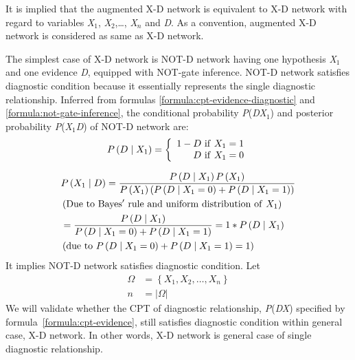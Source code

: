\documentclass{article}
\numberwithin{equation}{section}
\numberwithin{figure}{section}
\numberwithin{table}{section}
\begin{document}
It is implied that the augmented X-D network is equivalent to X-D network with regard to variables \textit{X}${}_{1}$, \textit{X}${}_{2}$,{\dots}, \textit{X${}_{n}$} and \textit{D}. As a convention, augmented X-D network is considered as same as X-D network.

The simplest case of X-D network is NOT-D network having one hypothesis \textit{X}${}_{1}$ and one evidence \textit{D}, equipped with NOT-gate inference. NOT-D network satisfies diagnostic condition because it essentially represents the single diagnostic relationship. Inferred from formulas \ref{formula:cpt-evidence-diagnostic} and \ref{formula:not-gate-inference}, the conditional probability \textit{P}(\textit{D{\textbar}X}${}_{1}$) and posterior probability \textit{P}(\textit{X}${}_{1}$\textit{{\textbar}D}) of NOT-D network are:
\[P\left(D\mathrel{\left|\vphantom{D X_1}\right.\kern-\nulldelimiterspace}X_1\right)=\left\{ \begin{array}{r}
1-D\ \mathrm{if}\ X_1=1 \\ 
D\ \mathrm{if}\ X_1=0 \end{array}
\right.\] 

\begin{align*}
&P\left(X_1\mathrel{\left|\vphantom{X_1 D}\right.\kern-\nulldelimiterspace}D\right)=\frac{P\left(D\mathrel{\left|\vphantom{D X_1}\right.\kern-\nulldelimiterspace}X_1\right)P\left(X_1\right)}{P\left(X_1\right)\left(P\left(D\mathrel{\left|\vphantom{D X_1=0}\right.\kern-\nulldelimiterspace}X_1=0\right)+P\left(D\mathrel{\left|\vphantom{D X_1=1}\right.\kern-\nulldelimiterspace}X_1=1\right)\right)}\\
&\left(\mathrm{Due}\ \mathrm{to}\ \mathrm{Bayes'}\ \mathrm{rule}\ \mathrm{and}\ \mathrm{uniform}\ \mathrm{distribution}\ \mathrm{of}\ X_1\right)\\
&=\frac{P\left(D\mathrel{\left|\vphantom{D X_1}\right.\kern-\nulldelimiterspace}X_1\right)}{P\left(D\mathrel{\left|\vphantom{D X_1=0}\right.\kern-\nulldelimiterspace}X_1=0\right)+P\left(D\mathrel{\left|\vphantom{D X_1=1}\right.\kern-\nulldelimiterspace}X_1=1\right)}=1*P\left(D\mathrel{\left|\vphantom{D X_1}\right.\kern-\nulldelimiterspace}X_1\right)\\
&\left(\mathrm{due\ to}\ P\left(D\mathrel{\left|\vphantom{D X_1=0}\right.\kern-\nulldelimiterspace}X_1=0\right)+P\left(D\mathrel{\left|\vphantom{D X_1=1}\right.\kern-\nulldelimiterspace}X_1=1\right)=1\right)
\end{align*}
It implies NOT-D network satisfies diagnostic condition. Let
\begin{align*}
\Omega&=\left\{X_1,X_2,\dots ,X_n\right\}\\
n&=\left|\Omega\right|
\end{align*}
We will validate whether the CPT of diagnostic relationship, \textit{P}(\textit{D{\textbar}X}) specified by formula~\ref{formula:cpt-evidence}, still satisfies diagnostic condition within general case, X-D network. In other words, X-D network is general case of single diagnostic relationship.
\end{document}
